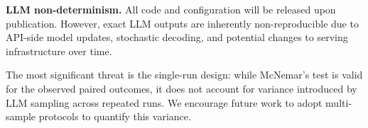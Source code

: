 \textbf{LLM non-determinism.}
All code and configuration will be released upon publication.
However, exact LLM outputs are inherently non-reproducible due to API-side model updates, stochastic decoding, and potential changes to serving infrastructure over time.

\medskip
\noindent
The most significant threat is the single-run design: while McNemar's test is valid for the observed paired outcomes, it does not account for variance introduced by LLM sampling across repeated runs.
We encourage future work to adopt multi-sample protocols to quantify this variance.


